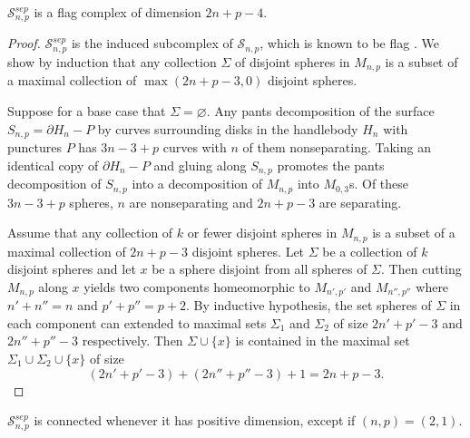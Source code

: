 \begin{lemma}
\label{sepflagdim}
$\mathcal {S}^{sep}_{n,p}$ is a flag complex of dimension $2n+p-4$.\\
\end{lemma}
\begin{proof}
$\mathcal {S}^{sep}_{n,p}$ is the induced subcomplex of $\mathcal {S}_{n,p}$,
which is known to be flag \cite{souto}.
We show by induction that any collection $\Sigma$ of disjoint spheres
in $M_{n,p}$
is a subset of a
maximal collection of $\max(2n+p-3,0)$ disjoint spheres.

Suppose for a base case that $\Sigma = \varnothing$.
Any pants decomposition of the surface $S_{n,p}=\partial H_{n} - P$ by curves surrounding
disks in the handlebody $H_n$ with punctures $P$ has
$3n-3+p$ curves with $n$ of them nonseparating.
Taking an identical copy of $\partial H_{n}-P$ and gluing along $S_{n,p}$
promotes the pants decomposition of $S_{n,p}$ into a decomposition of $M_{n,p}$ into $M_{0,3}$s.
Of these $3n-3+p$ spheres, $n$ are nonseparating and $2n+p-3$ are separating.

Assume that any collection of $k$ or fewer disjoint spheres in $M_{n,p}$ is a subset of a
maximal collection of $2n+p-3$ disjoint spheres.
Let $\Sigma$ be a collection of $k$ disjoint spheres and let $x$
be a sphere disjoint from all spheres of $\Sigma$.
Then cutting $M_{n,p}$ along $x$ yields two components
homeomorphic to
$M_{n',p'}$ and $M_{n'',p''}$ where $n'+n'' =n$ and $p'+p''=p+2$.
By inductive hypothesis, the set spheres of $\Sigma$ in each component can
extended to maximal sets $\Sigma_1$ and $\Sigma_2$ of size
$2n'+p'-3$
and
$2n''+p''-3$
respectively.
Then $\Sigma \cup \{x\}$ is contained in the maximal set
$\Sigma_1 \cup \Sigma_2 \cup \{x\}$ of size
$$
(2n'+p'-3) + (2n''+p''-3) + 1 =2n+p-3.
$$
\end{proof}


\begin{lemma}
  $\mathcal {S}^{sep}_{n,p}$ is connected
whenever it has positive dimension, except if
$(n,p)=(2,1)$.
\end{lemma}


